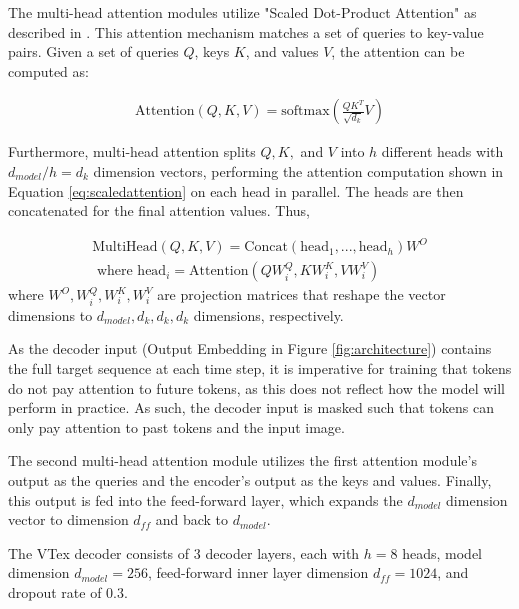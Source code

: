 The multi-head attention modules utilize "Scaled Dot-Product Attention" as described in \cite{Attention}. This attention mechanism matches a set of queries to key-value pairs. Given a set of queries $Q$, keys $K$, and values $V$, the attention can be computed as:

\begin{equation} \label{eq:scaledattention}
\begin{split}
    \textrm{Attention}(Q,K,V) = \textrm{softmax}(\frac{QK^T}{\sqrt{d_k}}V)
\end{split}
\end{equation}

Furthermore, multi-head attention splits $Q,K,$ and $V$ into $h$ different heads with $d_{model}/h=d_k$ dimension vectors, performing the attention computation shown in Equation \ref{eq:scaledattention} on each head in parallel. The heads are then concatenated for the final attention values. Thus,

\begin{equation} \label{eq:multihead}
\begin{split}
    \textrm{MultiHead}(Q,K,V) = \textrm{Concat}(\textrm{head}_1, \textrm{...},\textrm{head}_h)W^O \\ 
    \textrm{ where head}_i = \textrm{Attention}(QW_i^Q, KW_i^K, VW_i^V)
\end{split}
\end{equation}
where $W^O, W_i^Q, W_i^K, W_i^V$ are projection matrices that reshape the vector dimensions to $d_{model}, d_k, d_k, d_k$ dimensions, respectively. 


As the decoder input (Output Embedding in Figure \ref{fig:architecture}) contains the full target sequence at each time step, it is imperative for training that tokens do not pay attention to future tokens, as this does not reflect how the model will perform in practice. As such, the decoder input is masked such that tokens can only pay attention to past tokens and the input image.

The second multi-head attention module utilizes the first attention module's output as the queries and the encoder's output as the keys and values. Finally, this output is fed into the feed-forward layer, which expands the $d_{model}$ dimension vector to dimension $d_{ff}$ and back to $d_{model}$.

The VTex decoder consists of 3 decoder layers, each with $h=8$ heads, model dimension $d_{model}=256$, feed-forward inner layer dimension $d_{ff}=1024$, and dropout rate of $0.3$.

